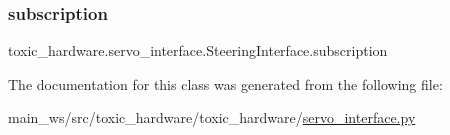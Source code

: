 \subsubsection{\texorpdfstring{subscription}{subscription}}
{\footnotesize\ttfamily toxic\+\_\+hardware.\+servo\+\_\+interface.\+Steering\+Interface.\+subscription}



The documentation for this class was generated from the following file\+:\begin{DoxyCompactItemize}
\item 
main\+\_\+ws/src/toxic\+\_\+hardware/toxic\+\_\+hardware/\mbox{\hyperlink{servo__interface_8py}{servo\+\_\+interface.\+py}}\end{DoxyCompactItemize}
